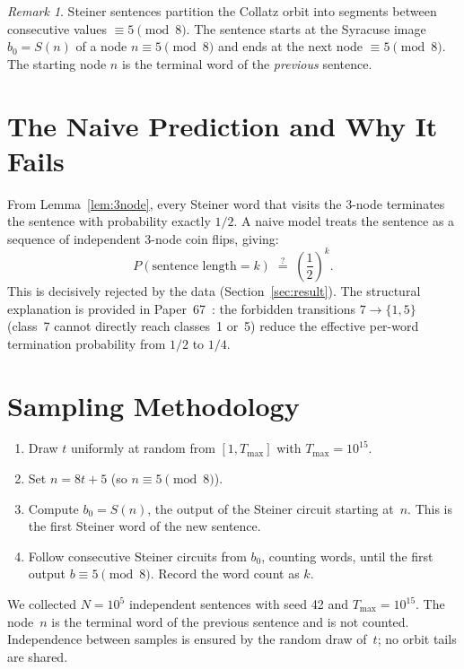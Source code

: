 \documentclass[12pt]{article}
\theoremstyle{definition}
\theoremstyle{remark}
\newtheorem{remark}[theorem]{Remark}
\newcommand{\Sm}{S}
\begin{document}
\begin{remark}
Steiner sentences partition the Collatz orbit into segments between consecutive
values $\equiv 5\pmod{8}$. The sentence starts at the Syracuse image $b_0 = \Sm(n)$
of a node $n\equiv 5\pmod{8}$ and ends at the next node $\equiv 5\pmod{8}$.
The starting node $n$ is the terminal word of the \emph{previous} sentence.
\end{remark}

\section{The Naive Prediction and Why It Fails}
\label{sec:naive}

From Lemma~\ref{lem:3node}, every Steiner word that visits the 3-node terminates
the sentence with probability exactly $1/2$. A naive model treats the sentence as
a sequence of independent 3-node coin flips, giving:
\[
  P(\text{sentence length} = k) \;\stackrel{?}{=}\; \left(\frac{1}{2}\right)^k.
\]
This is decisively rejected by the data (Section~\ref{sec:result}).
The structural explanation is provided in Paper~67~\cite{paper67}: the
forbidden transitions $7 \to \{1,5\}$ (class~7 cannot directly reach classes~1
or~5) reduce the effective per-word termination probability from $1/2$ to $1/4$.

\section{Sampling Methodology}
\label{sec:sampling}

\begin{enumerate}
  \item Draw $t$ uniformly at random from $[1, T_{\max}]$ with $T_{\max} = 10^{15}$.
  \item Set $n = 8t + 5$ (so $n \equiv 5 \pmod{8}$).
  \item Compute $b_0 = \Sm(n)$, the output of the Steiner circuit starting at~$n$.
        This is the first Steiner word of the new sentence.
  \item Follow consecutive Steiner circuits from $b_0$, counting words, until
        the first output $b \equiv 5 \pmod{8}$. Record the word count as $k$.
\end{enumerate}

We collected $N = 10^5$ independent sentences with seed 42 and $T_{\max} = 10^{15}$.
The node~$n$ is the terminal word of the previous sentence and is not counted.
Independence between samples is ensured by the random draw of~$t$; no orbit
tails are shared.
\end{document}
